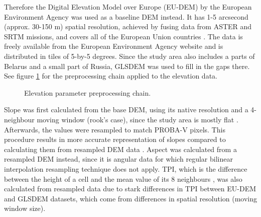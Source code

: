 \documentclass[a4paper,10pt]{book}
\begin{document}
Therefore the Digital Elevation Model over Europe (EU-DEM) by the European Environment Agency was used as a baseline DEM instead. It has 1-5 arcsecond (approx. 30-150 m) spatial resolution, achieved by fusing data from ASTER and SRTM missions, and covers all of the European Union countries \citep{bashfield2011eudem}. The data is freely available from the European Environment Agency website and is distributed in tiles of 5-by-5 degrees. Since the study area also includes a parts of Belarus and a small part of Russia, GLSDEM was used to fill in the gaps there. See figure \ref{fig-elevation-preprocessing} for the preprocessing chain applied to the elevation data.

\begin{figure}
  \centering
  \caption{Elevation parameter preprocessing chain.}
  \label{fig-elevation-preprocessing}
\end{figure}

Slope was first calculated from the base DEM, using its native resolution and a 4-neighbour moving window (rook's case), since the study area is mostly flat \citep{jones1998dem}. Afterwards, the values were resampled to match PROBA-V pixels. This procedure results in more accurate representation of slopes compared to calculating them from resampled DEM data \citep{grohmann2015demresampling, wu2008demresampling}. Aspect was calculated from a resampled DEM instead, since it is angular data for which regular bilinear interpolation resampling technique does not apply. TPI, which is the difference between the height of a cell and the mean value of its 8 neighbours \citep{weiss2001topographic, wilson2007terrain}, was also calculated from resampled data due to stark differences in TPI between EU-DEM and GLSDEM datasets, which come from differences in spatial resolution (moving window size).
\end{document}
